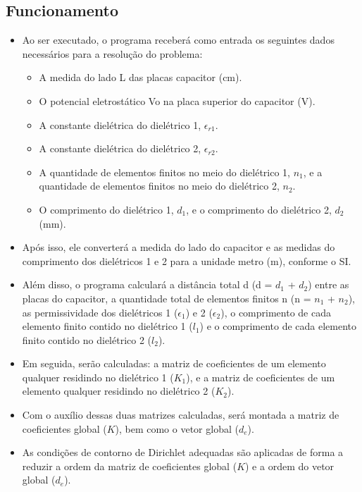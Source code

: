 \documentclass[10pt]{article}
\begin{document}
    \subsection{Funcionamento}
    \begin{itemize}
    \item Ao ser executado, o programa receberá como entrada os seguintes dados necessários para a resolução do problema:
        \begin{itemize}
        \item A medida do lado L das placas capacitor (cm).
        \item O potencial eletrostático Vo na placa superior do capacitor (V).
        \item A constante dielétrica do dielétrico 1, $\epsilon_{r1}$.
        \item A constante dielétrica do dielétrico 2, $\epsilon_{r2}$.
        \item A quantidade de elementos finitos no meio do dielétrico 1, $n_{1}$, e a quantidade de elementos finitos no meio do dielétrico 2, $n_{2}$.
        \item O comprimento do dielétrico 1, $d_{1}$, e o comprimento do dielétrico 2, $d_{2}$ (mm).
        \end{itemize}
    \item Após isso, ele converterá a medida do lado do capacitor e as medidas do comprimento dos dielétricos 1 e 2 para a unidade metro (m), conforme o SI.
    \item Além disso, o programa calculará a distância total d (d = $d_{1}$ + $d_{2}$) entre as placas do capacitor, a quantidade total de elementos finitos n (n = $n_{1}$ + $n_{2}$), as permissividade dos dielétricos 1 ($\epsilon_{1}$) e 2 ($\epsilon_{2}$), o comprimento de cada elemento finito contido no dielétrico 1 ($l_{1}$) e o comprimento de cada elemento finito contido no dielétrico 2 ($l_{2}$).
    \item Em seguida, serão calculadas: a matriz de coeficientes de um elemento qualquer residindo no dielétrico 1 ($K_{1}$), e a matriz de coeficientes de um elemento qualquer residindo no dielétrico 2 ($K_{2}$).
    \item Com o auxílio dessas duas matrizes calculadas, será montada a matriz de coeficientes global ($K$), bem como o vetor global ($d_{e}$).
    \item As condições de contorno de Dirichlet adequadas são aplicadas de forma a reduzir a ordem da matriz de coeficientes global ($K$) e a ordem do vetor global ($d_{e}$).

\end{itemize}
\end{document}
